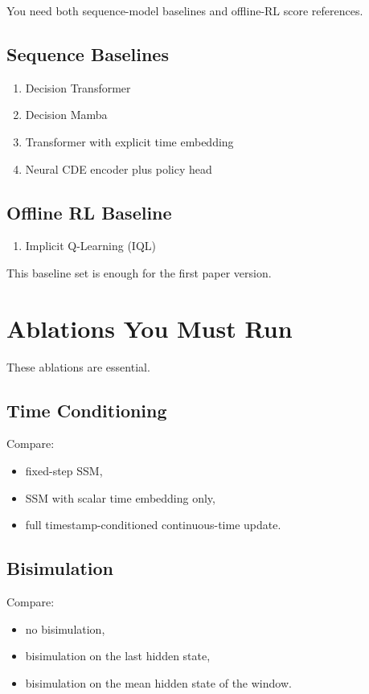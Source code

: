 \documentclass[11pt]{article}
\begin{document}
You need both sequence-model baselines and offline-RL score references.

\subsection{Sequence Baselines}
\begin{enumerate}[leftmargin=1.5em]
    \item Decision Transformer
    \item Decision Mamba
    \item Transformer with explicit time embedding
    \item Neural CDE encoder plus policy head
\end{enumerate}

\subsection{Offline RL Baseline}
\begin{enumerate}[leftmargin=1.5em, start=5]
    \item Implicit Q-Learning (IQL)
\end{enumerate}

This baseline set is enough for the first paper version.

\section{Ablations You Must Run}

These ablations are essential.

\subsection{Time Conditioning}
Compare:
\begin{itemize}[leftmargin=1.5em]
    \item fixed-step SSM,
    \item SSM with scalar time embedding only,
    \item full timestamp-conditioned continuous-time update.
\end{itemize}

\subsection{Bisimulation}
Compare:
\begin{itemize}[leftmargin=1.5em]
    \item no bisimulation,
    \item bisimulation on the last hidden state,
    \item bisimulation on the mean hidden state of the window.
\end{itemize}
\end{document}
